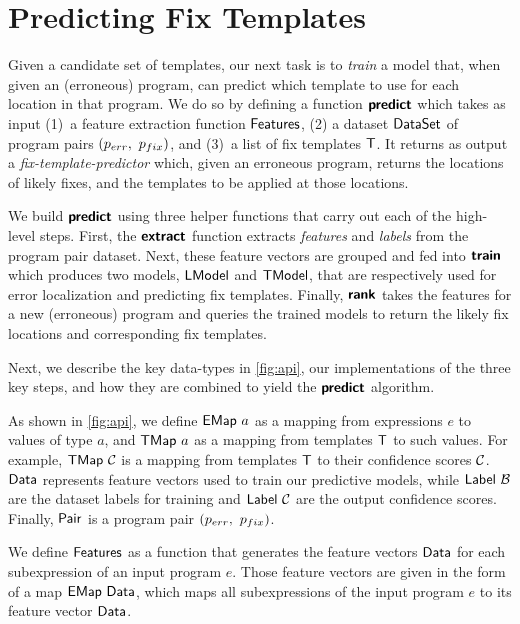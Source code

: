 \section{Predicting Fix Templates}
\label{sec:templ-pred}

Given a candidate set of templates, our next task is to \emph{train} a model
that, when given an (erroneous) program, can predict which template to use for
each location in that program.
%
We do so by defining a function $\bm{\mathsf{predict}}$ which takes as input
%
(1)~a feature extraction function $\mathsf{Features}$,
%
(2) a dataset $\mathsf{DataSet}$ of program pairs $(p_{err},\ p_{fix})$, and
%
(3)~a list of fix templates $\mathsf{T}$.
%
It returns as output a \emph{fix-template-predictor} which, given an
erroneous program, returns the locations of likely fixes, and the templates to
be applied at those locations.

We build $\bm{\mathsf{predict}}$ using three helper functions that carry out each of the
high-level steps.
%
First, the $\bm{\mathsf{extract}}$ function extracts \emph{features} and \emph{labels}
from the program pair dataset. Next, these feature vectors are grouped and fed
into $\bm{\mathsf{train}}$ which produces two models, $\mathsf{LModel}$ and $\mathsf{TModel}$, that are
respectively used for error localization and predicting fix templates.
%
Finally, $\bm{\mathsf{rank}}$ takes the features for a new (erroneous) program and
queries the trained models to return the likely fix locations and corresponding
fix templates.

Next, we describe the key data-types in \autoref{fig:api}, our implementations
of the three key steps, and how they are combined to yield the $\bm{\mathsf{predict}}$
algorithm.

As shown in \autoref{fig:api}, we define $\mathsf{EMap}\ a$ as a mapping from
expressions $e$ to values of type $a$, and $\mathsf{TMap}\ a$ as a mapping from
templates $\mathsf{T}$ to such values. For example, $\mathsf{TMap}\ \mathcal{C}$ is a mapping from
templates $\mathsf{T}$ to their confidence scores $\mathcal{C}$. $\mathsf{Data}$ represents feature
vectors used to train our predictive models, while $\mathsf{Label}\ \mathcal{B}$ are the
dataset labels for training and $\mathsf{Label}\ \mathcal{C}$ are the output confidence
scores. Finally, $\mathsf{Pair}$ is a program pair $(p_{err},\ p_{fix})$.

We define $\mathsf{Features}$ as a function that generates the feature vectors
$\mathsf{Data}$ for each subexpression of an input program $e$. Those feature vectors
are given in the form of a map $\mathsf{EMap}\ \mathsf{Data}$, which maps all subexpressions
of the input program $e$ to its feature vector $\mathsf{Data}$.


